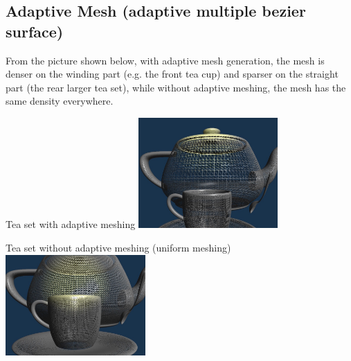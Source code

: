 \documentclass[acmtog]{acmart}
\begin{document}
\newpage

\subsection{Adaptive Mesh (adaptive multiple bezier surface)}

From the picture shown below, with adaptive mesh generation, the mesh is denser on the winding part (e.g. the front tea cup) and sparser on the straight part (the rear larger tea set), while without adaptive meshing, the mesh has the same density everywhere.

\begin{center}
	Tea set with adaptive meshing
	\includegraphics[width=0.4\textwidth]{images/adaptive-1.jpg}
\end{center}

\begin{center}
	Tea set without adaptive meshing (uniform meshing)
	\includegraphics[width=0.4\textwidth]{images/not-adaptive-1.jpg}
\end{center}



\end{document}
